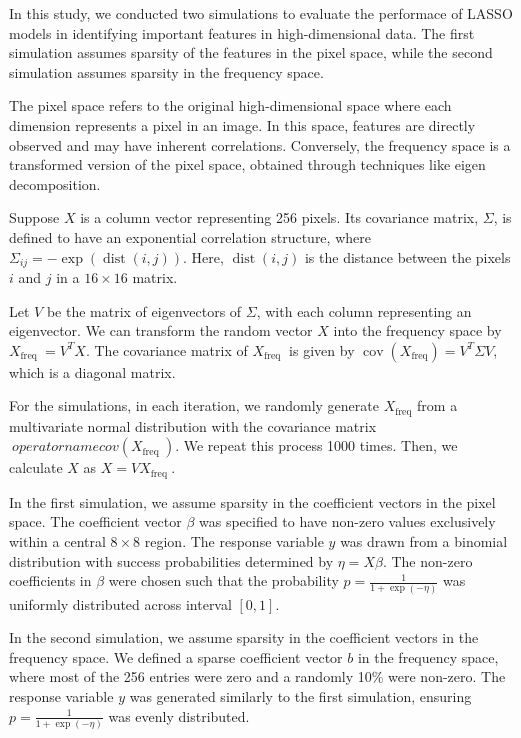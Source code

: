 \documentclass[12pt]{article}
\begin{document}
In this study, we conducted two simulations to evaluate the performace of LASSO
models in identifying important features in high-dimensional data. The first
simulation assumes sparsity of the features in the pixel space, while the
second simulation assumes sparsity in the frequency space.

The pixel space refers to the original high-dimensional space where each
dimension represents a pixel in an image. In this space, features are directly
observed and may have inherent correlations. Conversely, the frequency space is
a transformed version of the pixel space, obtained through techniques like
eigen decomposition.

Suppose \( X \) is a column vector representing 256 pixels. Its covariance
matrix, \( \Sigma \), is defined to have an exponential correlation structure,
where \( \Sigma_{i j}=-\exp (\operatorname{dist}(i, j)) \). Here, \(
\operatorname{dist}(i, j) \) is the distance between the pixels \( i \) and \(
j \) in a \( 16 \times 16 \) matrix.

Let \( V \) be the matrix of eigenvectors of \( \Sigma \), with each column
representing an eigenvector. We can transform the random vector \( X \) into
the frequency space by \( X_{\text {freq }}=V^T X \). The covariance matrix of
\( X_{\text {freq }} \) is given by \(
\operatorname{cov}\left(X_{\mathrm{freq}}\right)=V^T \Sigma V \), which is a
diagonal matrix.

For the simulations, in each iteration, we randomly generate \( X_{\text {freq
}} \) from a multivariate normal distribution with the covariance matrix \(\
operatorname{cov}\left(X_{\text {freq }}\right) \). We repeat this process 1000
times. Then, we calculate \( X \) as \( X=V X_{\text {freq }} \).

In the first simulation, we assume sparsity in the coefficient vectors in the
pixel space. The coefficient vector \( \beta \) was specified to have non-zero
values exclusively within a central \( 8 \times 8 \) region. The response
variable \( y \) was drawn from a binomial distribution with success
probabilities determined by \( \eta = X \beta \). The non-zero coefficients in
\( \beta \) were chosen such that the probability \( p = \frac{1}{1 +
\exp(-\eta)} \) was uniformly distributed across interval \( [0, 1] \).

In the second simulation, we assume sparsity in the coefficient vectors in the
frequency space. We defined a sparse coefficient vector \( b \) in the
frequency space, where most of the 256 entries were zero and a randomly 10\%
were non-zero. The response variable \( y \) was generated similarly to the
first simulation, ensuring \( p = \frac{1}{1 + \exp(-\eta)} \) was evenly
distributed.
\end{document}
